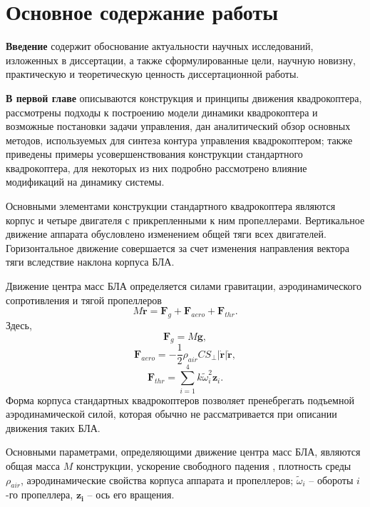 \chapter{Основное содержание работы}
\textbf{Введение} содержит обоснование актуальности научных исследований, изложенных в диссертации,
а также сформулированные цели, научную новизну, практическую и теоретическую ценность диссертационной работы.

\textbf{В первой главе} описываются конструкция и принципы движения квадрокоптера,
рассмотрены подходы к построению модели динамики квадрокоптера и возможные постановки задачи управления,
дан аналитический обзор основных методов, используемых для синтеза контура управления квадрокоптером;
также приведены примеры усовершенствования конструкции стандартного квадрокоптера,
для некоторых из них подробно рассмотрено влияние модификаций на динамику системы.

Основными элементами конструкции стандартного квадрокоптера являются корпус и четыре двигателя с прикрепленными к ним пропеллерами. Вертикальное движение аппарата обусловлено изменением общей тяги всех двигателей. Горизонтальное движение совершается за счет изменения направления вектора тяги вследствие наклона корпуса БЛА.

Движение центра масс БЛА определяется силами гравитации, аэродинамического сопротивления и тягой пропеллеров
\begin{equation} \label{eq:common_traslational_motion}
M \ddot{\bm{r}} = \bm{F}_g + \bm{F}_{aero} + \bm{F}_{thr}.
\end{equation}
Здесь, 
\begin{equation} \label{eq:gravity_force}
\bm{F}_g = M\bm{g},
\end{equation}
\begin{equation} \label{eq:aerodynamic_force}
\bm{F}_{aero} = - \frac{1}{2} \rho_{air} C S_{\perp} |\dot{\bm{r}}| \dot{\bm{r}},
\end{equation}
\begin{equation} \label{eq:thrust_force}
\bm{F}_{thr} = \sum_{i=1}^{4}{ { k \tilde\omega^2_i \bm{z}_i}.}
\end{equation}
Форма корпуса стандартных квадрокоптеров позволяет пренебрегать подъемной аэродинамической силой, которая обычно не рассматривается при описании движения таких БЛА.

Основными параметрами, определяющими движение центра масс БЛА, являются общая масса {$M$} конструкции, ускорение свободного падения , плотность среды {$\rho_{air}$}, аэродинамические свойства корпуса аппарата и пропеллеров; $\tilde\omega_i$ -- обороты $i$-го пропеллера, $\bm{z_i}$ -- ось его вращения.

